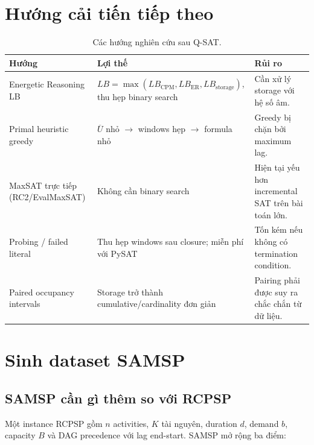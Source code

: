 \documentclass[11pt,a4paper]{article}
\theoremstyle{remark}
\begin{document}
\section{Hướng cải tiến tiếp theo}
\label{sec:future}

\begin{table}[htbp]
\centering
\caption{Các hướng nghiên cứu sau Q-SAT.}
\label{tab:future}
\begin{tabularx}{\textwidth}{@{}p{}Y Y@{}}
\toprule
\textbf{Hướng} & \textbf{Lợi thế} & \textbf{Rủi ro}\\
\midrule
Energetic Reasoning LB
  & $LB = \max(LB_\mathrm{CPM}, LB_\mathrm{ER}, LB_\mathrm{storage})$,
    thu hẹp binary search
  & Cần xử lý storage với hệ số âm.\\
Primal heuristic greedy
  & $\overline{U}$ nhỏ $\to$ windows hẹp $\to$ formula nhỏ
  & Greedy bị chặn bởi maximum lag.\\
MaxSAT trực tiếp (RC2/EvalMaxSAT)
  & Không cần binary search
  & Hiện tại yếu hơn incremental SAT trên bài toán lớn.\\
Probing / failed literal
  & Thu hẹp windows sau closure; miễn phí với PySAT
  & Tốn kém nếu không có termination condition.\\
Paired occupancy intervals
  & Storage trở thành cumulative/cardinality đơn giản
  & Pairing phải được suy ra chắc chắn từ dữ liệu.\\
\bottomrule
\end{tabularx}
\end{table}

\section{Sinh dataset SAMSP}
\label{sec:dataset}

\subsection{SAMSP cần gì thêm so với RCPSP}

Một instance RCPSP gồm $n$ activities, $K$ tài nguyên, duration $d$,
demand $b$, capacity $B$ và DAG precedence với lag end-start.
SAMSP mở rộng ba điểm:
\end{document}
